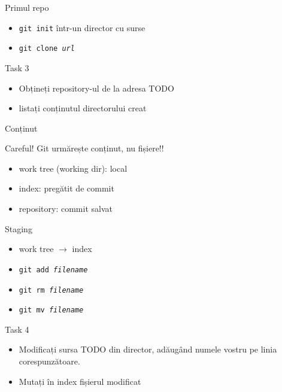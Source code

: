 \documentclass{beamer}
\begin{document}
\begin{frame}{Primul repo}
  \begin{itemize}
    \item \texttt{git init} într-un director cu surse
    \item \texttt{git clone \textit{url}}
  \end{itemize}
  \pause
  \begin{alertblock}{Task 3}
    \begin{itemize}
      \item Obțineți repository-ul de la adresa TODO
      \item listați conținutul directorului creat
    \end{itemize}
  \end{alertblock}
\end{frame}

\begin{frame}{Conținut}
  \begin{alertblock}{Careful!}
    Git urmărește conținut, nu fișiere!!
  \end{alertblock}
  \pause
  \begin{itemize}
    \item work tree (working dir): local
    \item index: pregătit de commit
    \item repository: commit salvat
  \end{itemize}
\end{frame}

\begin{frame}{Staging}
  \begin{itemize}
    \item work tree $\rightarrow$ index
    \item \texttt{git add \textit{filename}}
    \item \texttt{git rm \textit{filename}}
    \item \texttt{git mv \textit{filename}}
  \end{itemize}
  \pause
  \begin{alertblock}{Task 4}
    \begin{itemize}
      \item Modificați sursa TODO din director, adăugând numele vostru pe linia
      corespunzătoare.
      \item Mutați în index fișierul modificat
    \end{itemize}
  \end{alertblock}
\end{frame}
\end{document}
